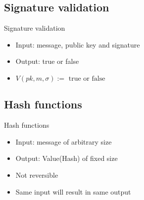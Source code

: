 \documentclass{beamer}
\begin{document}
\subsection{Signature validation}
\begin{frame}{Signature validation}
	\begin{itemize}
		\item Input: message, public key and signature
		\item Output: true or false
		\item $V(pk, m, \sigma) := \text{ true or false}$
	\end{itemize}
\end{frame}
\subsection{Hash functions}
\begin{frame}{Hash functions}
	\begin{itemize}
		\item Input: message of arbitrary size
		\item Output: Value(Hash) of fixed size
		\item Not reversible
		\item Same input will result in same output
	\end{itemize}
\end{frame}
\end{document}
